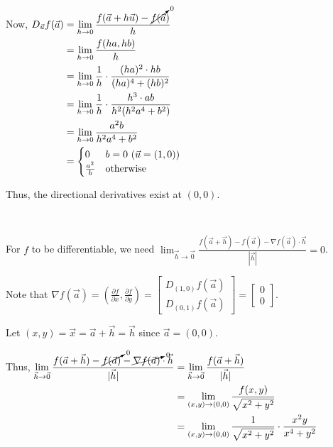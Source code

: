 \documentclass[11pt,fleqn]{book} %
\begin{document}
Now, 
$\begin{aligned}[t]
    D_{\vec{u}} f(\vec{a}) & = \lim_{h\to0} \frac{f(\vec{a} + h\vec{u}) - \cancelto{0}{f(\vec{a}})}{h} \\
                           & = \lim_{h\to0} \frac{f(ha, hb)}{h}                                        \\
                           & = \lim_{h\to0} \frac{1}{h} \cdot \frac{(ha)^2 \cdot hb}{(ha)^4 + (hb)^2}  \\
                           & = \lim_{h\to0} \frac{1}{h} \cdot \frac{h^3 \cdot ab}{h^2(h^2a^4 + b^2)}   \\
                           & = \lim_{h\to0} \frac{a^2b}{h^2a^4 + b^2}                                  \\
                           & = \begin{cases}
                                   0             & b = 0 ~ (\vec{u} = (1,0)) \\
                                   \frac{a^2}{b} & \text{otherwise}
                               \end{cases}
\end{aligned}$

Thus, the directional derivatives exist at $(0,0)$. 

{~~~}

For $f$ to be differentiable, we need $\lim_{\vec{h}\to\vec{0}} \frac{f(\vec{a} + \vec{h}) - f(\vec{a}) - \nabla f(\vec{a}) \cdot \vec{h}}{| \vec{h} |} = 0$. 

Note that $\nabla f(\vec{a}) = \left( \frac{\partial f}{\partial x}, \frac{\partial f}{\partial y} \right) = \begin{bmatrix} D_{(1,0)} f(\vec{a}) \\ D_{(0,1)} f(\vec{a}) \end{bmatrix} = \begin{bmatrix} 0 \\ 0 \end{bmatrix}$.

Let $(x,y) = \vec{x} = \vec{a} + \vec{h} = \vec{h}$ since $\vec{a} = (0,0)$. 

Thus, 
$\begin{aligned}[t]
    \lim_{\vec{h}\to\vec{0}} \frac{f(\vec{a} + \vec{h}) - \cancelto{0}{f(\vec{a})} - \cancelto{0}{\nabla f(\vec{a})} \cdot \vec{h}}{| \vec{h} |}
     & = \lim_{\vec{h}\to\vec{0}} \frac{f(\vec{a} + \vec{h})}{| \vec{h} |}          \\
     & = \lim_{(x,y)\to(0,0)} \frac{f(x,y)}{\sqrt{x^2 + y^2}}                       \\
     & = \lim_{(x,y)\to(0,0)} \frac{1}{\sqrt{x^2+y^2}} \cdot \frac{x^2y}{x^4 + y^2} 
\end{aligned}$
\end{document}
